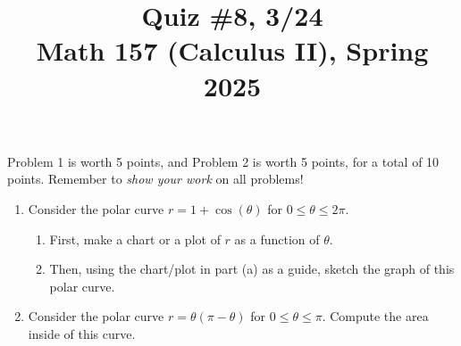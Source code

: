 \documentclass[11pt]{article}
\title{Quiz \#8, 3/24\\ Math 157 (Calculus II), Spring 2025}
\date{}
\begin{document}
\maketitle

\thispagestyle{empty}

\vspace{-2cm}

Problem 1 is worth 5 points, and Problem 2 is worth 5 points, for a total of 10 points. Remember to \emph{show your work} on all problems!

\begin{enumerate}
\item Consider the polar curve $r=1+\cos(\theta)$ for $0 \leq \theta \leq 2\pi$.
\begin{enumerate}
\item First, make a chart or a plot of $r$ as a function of $\theta$.
\item Then, using the chart/plot in part (a) as a guide, sketch the graph of this polar curve.
\end{enumerate}

\vspace{3.25in}

\item Consider the polar curve $r=\theta(\pi-\theta)$ for $0 \leq \theta \leq \pi$. Compute the area inside of this curve.

\end{enumerate}
\end{document}
